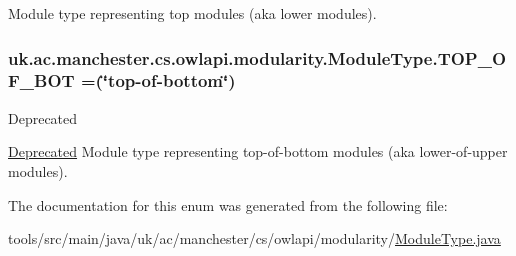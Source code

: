 Module type representing top modules (aka lower modules). \hypertarget{enumuk_1_1ac_1_1manchester_1_1cs_1_1owlapi_1_1modularity_1_1_module_type_a6eb94f1595752cd4d3e61302a43603d1}{
\subsubsection[{T\-O\-P\-\_\-\-O\-F\-\_\-\-B\-O\-T}]{\setlength{\rightskip}{0pt plus 5cm}uk.\-ac.\-manchester.\-cs.\-owlapi.\-modularity.\-Module\-Type.\-T\-O\-P\-\_\-\-O\-F\-\_\-\-B\-O\-T =(\char`\"{}top-\/of-\/bottom\char`\"{})}}\label{enumuk_1_1ac_1_1manchester_1_1cs_1_1owlapi_1_1modularity_1_1_module_type_a6eb94f1595752cd4d3e61302a43603d1}
\begin{DoxyRefDesc}{Deprecated}
\item[\hyperlink{deprecated__deprecated000049}{Deprecated}]Module type representing top-\/of-\/bottom modules (aka lower-\/of-\/upper modules). \end{DoxyRefDesc}


The documentation for this enum was generated from the following file\-:\begin{DoxyCompactItemize}
\item 
tools/src/main/java/uk/ac/manchester/cs/owlapi/modularity/\hyperlink{_module_type_8java}{Module\-Type.\-java}\end{DoxyCompactItemize}

